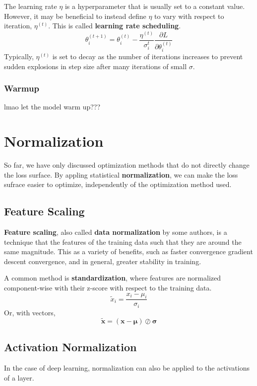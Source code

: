 \documentclass[12pt]{report}
\theoremstyle{definition}
\theoremstyle{remark}
\begin{document}
The learning rate $\eta$ is a hyperparameter that is usually set to a constant value. However, it may be beneficial to instead define $\eta$ to vary with respect to iteration, $\eta^{(t)}$. This is called \textbf{learning rate scheduling}.
\begin{equation}
    \theta_{i}^{(t+1)} = \theta_{i}^{(t)} - \frac{\eta^{(t)}}{\sigma_i^t}\frac{\partial L}{\partial \theta_i^{(t)}}
\end{equation}
Typically, $\eta^{(t)}$ is set to decay as the number of iterations increases to prevent sudden explosions in step size after many iterations of small $\sigma$.

\subsubsection{Warmup}

lmao let the model warm up???

\section{Normalization}
So far, we have only discussed optimization methods that do not directly change the loss surface. By appling statistical \textbf{normalization}, we can make the loss sufrace easier to optimize, independently of the optimization method used.

\subsection{Feature Scaling}
\textbf{Feature scaling}, also called \textbf{data normalization} by some authors, is a technique that the features of the training data such that they are around the same magnitude. This as a variety of benefits, such as faster convergence gradient descent convergence, and in general, greater stability in training.

A common method is \textbf{standardization}, where features are normalized component-wise with their z-score with respect to the training data.
\begin{equation}
    \tilde{x}_i = \frac{x_i - \mu_i}{\sigma_i}
\end{equation}
Or, with vectors,
\begin{equation}
    \tilde{\mathbf{x}} = (\mathbf{x} - \boldsymbol{\mu}) \oslash \boldsymbol{\sigma}
\end{equation}

\subsection{Activation Normalization}
In the case of deep learning, normalization can also be applied to the activations of a layer.
\end{document}
